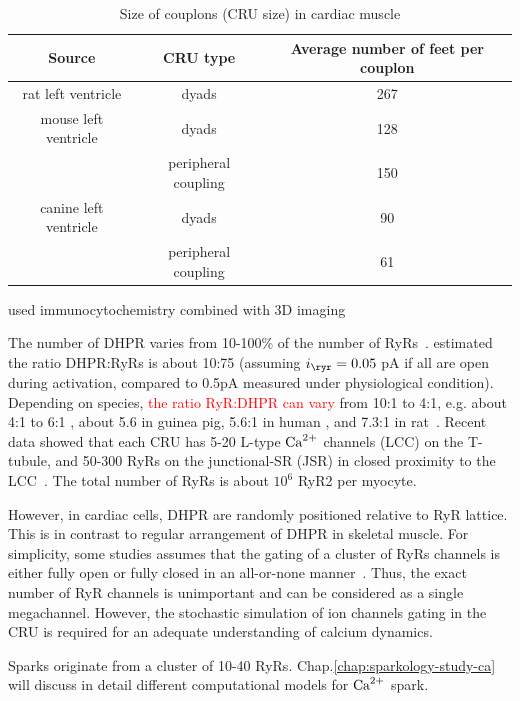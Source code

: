   \begin{table}[hbt]
    \begin{center}
      \caption{Size of couplons (CRU size) in cardiac muscle}
      \begin{tabular}{ccc} 
        \hline
        Source & CRU type & Average number of feet per couplon \\ 
        \hline\hline
        rat left ventricle & dyads & 267 \\
        mouse left ventricle & dyads & 128 \\
        & peripheral coupling & 150 \\
        canine left ventricle & dyads & 90 \\
        & peripheral coupling & 61 \\
      \end{tabular}
    \end{center}
    \label{tab:Feet_couplon_cardiac}
  \end{table}

\citep{soeller2007} used immunocytochemistry combined with 3D imaging

The number of DHPR varies from 10-100\% of the number of RyRs~\citep{Sun1995}.
\citep{mejia-alvarez1999} estimated the ratio DHPR:RyRs is about 10:75 (assuming
$i_\ryr=0.05$ pA if all are open during activation, compared to 0.5pA measured
under physiological condition). Depending on species, \textcolor{red}{the ratio
RyR:DHPR can vary} from 10:1 to 4:1, e.g. about 4:1 to 6:1 \citep{wang2001},
about 5.6 in guinea pig, 5.6:1 in human \citep{bers1992}, and 7.3:1 in
rat~\citep{bers1993rrd}.
Recent data showed that each CRU has 5-20 L-type ${\text{Ca}^{2+}}$ channels (LCC) on the
T-tubule, and 50-300 RyRs on the junctional-SR (JSR) in closed proximity to the
LCC~\citep{chen-izu2006tdd, bers2008cca}. The total number of RyRs is about
$10^6$ RyR2 per myocyte.


However, in cardiac cells, DHPR are randomly positioned relative to
RyR lattice. This is in contrast to regular arrangement of DHPR in
skeletal muscle. For simplicity, some studies assumes that the gating
of a cluster of RyRs channels is either fully open or fully closed in
an all-or-none manner~\citep{williams2007pda}. Thus, the exact number of
RyR channels is unimportant and can be considered as a single
megachannel. However, the stochastic simulation of ion channels gating
in the CRU is required for an adequate understanding of calcium
dynamics.

Sparks originate from a cluster of 10-40 RyRs\citep{inoue2003}. 
Chap.\ref{chap:sparkology-study-ca} will discuss in
detail different computational models for ${\text{Ca}^{2+}}$ spark.


